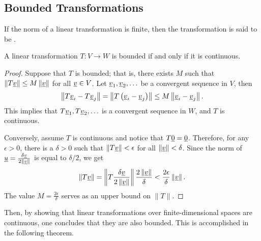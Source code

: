 \subsection{Bounded Transformations}

\begin{definition}
If the norm of a linear transformation is finite, then the transformation is said to be .
\end{definition}

\begin{theorem}
A linear transformation $T \colon V \rightarrow W$ is bounded if and only if it is continuous.
\end{theorem}
\begin{proof}
Suppose that $T$ is bounded; that is, there exists $M$ such that  $\left\| T \underline{v} \right\| \leq M \left\| \underline{v} \right\|$ for all $\underline{v} \in V$.
Let $\underline{v}_1, \underline{v}_2, \ldots$ be a convergent sequence in $V$, then
\begin{equation*}
\left\| T \underline{v}_i - T \underline{v}_j \right\|
= \left\| T \left( \underline{v}_i - \underline{v}_j \right) \right\|
\leq  M \left\| \underline{v}_i - \underline{v}_j \right\| .
\end{equation*}
This implies that $T \underline{v}_1, T \underline{v}_2, \ldots$ is a convergent sequence in $W$, and $T$ is continuous.

Conversely, assume $T$ is continuous and notice that $T \underline{0} = \underline{0}$.
Therefore, for any $\epsilon > 0$, there is a $\delta>0$ such that $\| T \underline{v} \| < \epsilon$ for all $\| \underline{v} \| < \delta$.
Since the norm of $\underline{u} = \frac{ \delta \underline{v} }{2 \left\| \underline{v} \right\| }$ is equal to $\delta/2$, we get
\begin{equation*}
\left\| T \underline{v} \right\|
= \left\| T \frac{ \delta \underline{v} }{2 \left\| \underline{v} \right\| } \right\|
\frac{ 2 \left\| \underline{v} \right\| }{ \delta }
< \frac{2 \epsilon}{ \delta } \left\| \underline{v} \right\|.
\end{equation*}
The value $M = \frac{2 \epsilon}{\delta}$ serves as an upper bound on $\|T\|$.
\end{proof}

Then, by showing that linear transformations over finite-dimensional spaces are continuous, one concludes that they are also bounded.
This is accomplished in the following theorem.

